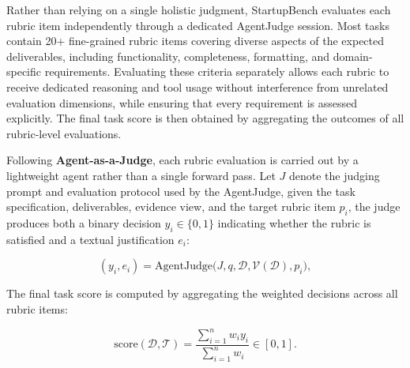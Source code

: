 Rather than relying on a single holistic judgment, StartupBench evaluates each rubric item independently through a dedicated AgentJudge session. Most tasks contain 20+ fine-grained rubric items covering diverse aspects of the expected deliverables, including functionality, completeness, formatting, and domain-specific requirements. Evaluating these criteria separately allows each rubric to receive dedicated reasoning and tool usage without interference from unrelated evaluation dimensions, while ensuring that every requirement is assessed explicitly. The final task score is then obtained by aggregating the outcomes of all rubric-level evaluations.

Following \textbf{Agent-as-a-Judge}, each rubric evaluation is carried out by a lightweight agent rather than a single forward pass. Let $J$ denote the judging prompt and evaluation protocol used by the AgentJudge, given the task specification, deliverables, evidence view, and the target rubric item $p_i$, the judge produces both a binary decision $y_i\in\{0,1\}$ indicating whether the rubric is satisfied and a textual justification $e_i$:

\begin{equation}
(y_i,e_i) = \mathrm{AgentJudge}\big(J, q,
\mathcal{D}, \mathcal{V}(\mathcal{D}), p_i\big),
\label{eq}
\end{equation}

The final task score is computed by aggregating the weighted decisions across all rubric items:

\begin{equation}
\mathrm{score}(\mathcal{D},\mathcal{T})
= \frac{\sum_{i=1}^{n} w_i y_i}{\sum_{i=1}^{n} w_i}
\in [0,1].
\label{eq2}
\end{equation}
